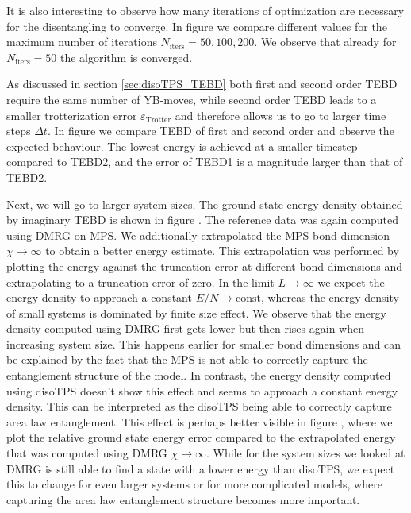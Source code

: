 
It is also interesting to observe how many iterations of optimization are necessary for the disentangling to converge. In figure \figref{} we compare different values for the maximum number of iterations $N_\text{iters} = 50, 100, 200$. We observe that already for $N_\text{iters} = 50$ the algorithm is converged. \par

As discussed in section \ref{sec:disoTPS_TEBD} both first and second order TEBD require the same number of YB-moves, while second order TEBD leads to a smaller trotterization error $\varepsilon_\text{Trotter}$ and therefore allows us to go to larger time steps $\Delta t$. In figure \figref{} we compare TEBD of first and second order and observe the expected behaviour. The lowest energy is achieved at a smaller timestep compared to TEBD2, and the error of TEBD1 is a magnitude larger than that of TEBD2. \par

Next, we will go to larger system sizes. The ground state energy density obtained by imaginary TEBD is shown in figure \figref{}. The reference data was again computed using DMRG on MPS. We additionally extrapolated the MPS bond dimension $\chi\rightarrow\infty$ to obtain a better energy estimate. This extrapolation was performed by plotting the energy against the truncation error at different bond dimensions and extrapolating to a truncation error of zero. In the limit $L\rightarrow\infty$ we expect the energy density to approach a constant $E/N\rightarrow \text{const}$, whereas the energy density of small systems is dominated by finite size effect. We observe that the energy density computed using DMRG first gets lower but then rises again when increasing system size. This happens earlier for smaller bond dimensions and can be explained by the fact that the MPS is not able to correctly capture the entanglement structure of the model. In contrast, the energy density computed using disoTPS doesn't show this effect and seems to approach a constant energy density. This can be interpreted as the disoTPS being able to correctly capture area law entanglement. This effect is perhaps better visible in figure \figref{}, where we plot the relative ground state energy error compared to the extrapolated energy that was computed using DMRG $\chi\rightarrow\infty$. While for the system sizes we looked at DMRG is still able to find a state with a lower energy than disoTPS, we expect this to change for even larger systems or for more complicated models, where capturing the area law entanglement structure becomes more important. \par
